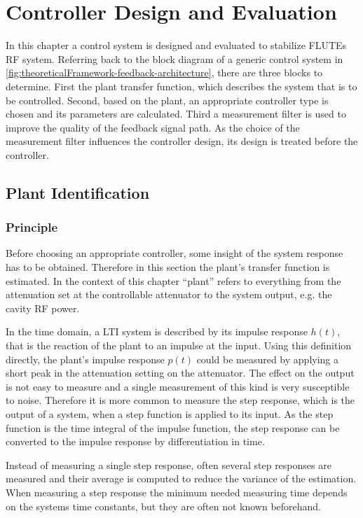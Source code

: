 \chapter{Controller Design and Evaluation}
In this chapter a control system is designed and evaluated to stabilize FLUTEs RF system.
Referring back to the block diagram of a generic control system in \autoref{fig:theoreticalFramework-feedback-architecture}, there are three blocks to determine.
First the plant transfer function, which describes the system that is to be controlled.
Second, based on the plant, an appropriate controller type is chosen and its parameters are calculated.
Third a measurement filter is used to improve the quality of the feedback signal path. As the choice of the measurement filter influences the controller design, its design is treated before the controller.

\section{Plant Identification}\label{sec:plantIdenti}
\subsection{Principle}
Before choosing an appropriate controller, some insight of the system response has to be obtained. Therefore in this section the plant's transfer function is estimated. In the context of this chapter ``plant'' refers to everything from the attenuation set at the controllable attenuator to the system output, e.g. the cavity RF power.

In the time domain, a LTI system is described by its impulse response $h(t)$, that is the reaction of the plant to an impulse at the input.
Using this definition directly, the plant's impulse response $p(t)$ could be measured by applying a short peak in the attenuation setting on the attenuator. The effect on the output is not easy to measure and a single measurement of this kind is very susceptible to noise.
Therefore it is more common to measure the step response\cite{Wang2000}, which is the output of a system, when a step function is applied to its input. As the step function is the time integral of the impulse function, the step response can be converted to the impulse response by differentiation in time.

Instead of measuring a single step response, often several step responses are measured and their average is computed to reduce the variance of the estimation. When measuring a step response the minimum needed measuring time depends on the systems time constants, but they are often not known beforehand.

